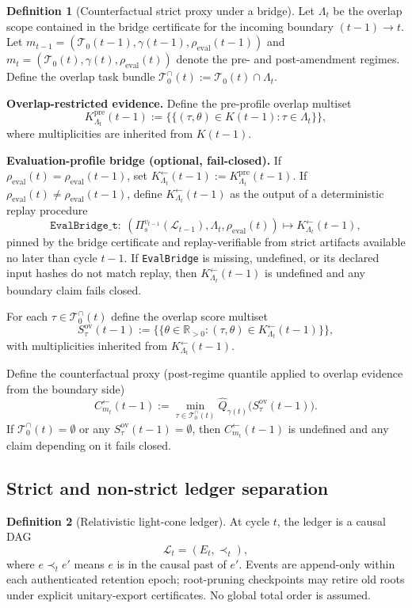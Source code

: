 \documentclass[11pt,a4paper]{article}
\newcommand{\R}{\mathbb{R}}
\newcommand{\EmpQ}{\widehat Q}
\newcommand{\mset}[1]{\{\!\{#1\}\!\}} %
\newcommand{\cL}{\mathcal{L}}
\newcommand{\cT}{\mathcal{T}}
\theoremstyle{definition}
\newtheorem{definition}{Definition}
\theoremstyle{remark}
\begin{document}
\begin{definition}[Counterfactual strict proxy under a bridge]\label{def:counterfactual_bridge_proxy}
Let $\Lambda_t$ be the overlap scope contained in the bridge certificate for the incoming boundary $(t-1)\to t$.
Let $m_{t-1}=(\cT_0(t-1),\gamma(t-1),\rho_{\mathrm{eval}}(t-1))$ and $m_t=(\cT_0(t),\gamma(t),\rho_{\mathrm{eval}}(t))$ denote the pre- and post-amendment regimes.
Define the overlap task bundle $\cT_0^{\cap}(t):=\cT_0(t)\cap \Lambda_t$.

\noindent\textbf{Overlap-restricted evidence.}
Define the pre-profile overlap multiset
\[
K^{\mathrm{pre}}_{\Lambda_t}(t-1):=\mset{(\tau,\theta)\in K(t-1):\tau\in\Lambda_t},
\]
where multiplicities are inherited from $K(t-1)$.

\noindent\textbf{Evaluation-profile bridge (optional, fail-closed).}
If $\rho_{\mathrm{eval}}(t)=\rho_{\mathrm{eval}}(t-1)$, set $K^{\leftarrow}_{\Lambda_t}(t-1):=K^{\mathrm{pre}}_{\Lambda_t}(t-1)$.
If $\rho_{\mathrm{eval}}(t)\neq\rho_{\mathrm{eval}}(t-1)$, define $K^{\leftarrow}_{\Lambda_t}(t-1)$ as the output of a deterministic replay procedure
\[
\texttt{EvalBridge\_t}:\ (\Pi_s^{v_{t-1}}(\cL_{t-1}),\Lambda_t,\rho_{\mathrm{eval}}(t))\mapsto K^{\leftarrow}_{\Lambda_t}(t-1),
\]
pinned by the bridge certificate and replay-verifiable from strict artifacts available no later than cycle $t-1$.
If \texttt{EvalBridge} is missing, undefined, or its declared input hashes do not match replay, then $K^{\leftarrow}_{\Lambda_t}(t-1)$ is undefined and any boundary claim fails closed.

For each $\tau\in\cT_0^{\cap}(t)$ define the overlap score multiset
\[
S^{\mathrm{ov}}_\tau(t-1):=\mset{\theta\in\R_{>0}:(\tau,\theta)\in K^{\leftarrow}_{\Lambda_t}(t-1)},
\]
with multiplicities inherited from $K^{\leftarrow}_{\Lambda_t}(t-1)$.

Define the counterfactual proxy (post-regime quantile applied to overlap evidence from the boundary side)
\[
C^{\leftarrow}_{m_t}(t-1):=
\min_{\tau\in\cT_0^{\cap}(t)}\EmpQ_{\gamma(t)}\big(S^{\mathrm{ov}}_\tau(t-1)\big).
\]
If $\cT_0^{\cap}(t)=\emptyset$ or any $S^{\mathrm{ov}}_\tau(t-1)=\emptyset$, then $C^{\leftarrow}_{m_t}(t-1)$ is undefined and any claim depending on it fails closed.
\end{definition}




\subsection{Strict and non-strict ledger separation}
\begin{definition}[Relativistic light-cone ledger]\label{def:relativistic_light_cone_ledger}
At cycle $t$, the ledger is a causal DAG
\[
\cL_t=(E_t,\prec_t),
\]
where $e\prec_t e'$ means $e$ is in the causal past of $e'$.
Events are append-only within each authenticated retention epoch; root-pruning checkpoints may retire old roots under explicit unitary-export certificates.
No global total order is assumed.
\end{definition}
\end{document}
